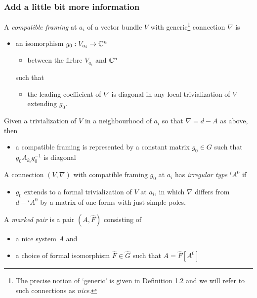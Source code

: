 \subsubsection{Add a little bit more information}
\begin{defn}
  A \emph{compatible framing} at $a_i$ of a vector bundle $V$ with
  generic\footnote{The precise notion of ‘generic’ is given in
    \cite{thboalch} Definition 1.2 and we will refer to such connections as
    \emph{nice}.} connection $\nabla$ is
  \begin{itemize}
    \item an isomorphism $g_0:V_{a_i}\to\mathbb{C}^n$
      \begin{itemize}
        \item between the firbre $V_{a_i}$ and $\mathbb{C}^n$
      \end{itemize}
      such that
      \begin{itemize}
        \item the leading coefficient of $\nabla$ is diagonal in any local
          trivialization of $V$ extending $g_0$.
      \end{itemize}
  \end{itemize}
  \begin{rem}
    Given a trivialization of $V$ in a neighbourhood of $a_i$ so that
    $\nabla=d-A$ as above, then
    \begin{itemize}
      \item a compatible framing is represented by a constant matrix
        $g_0\in G$ such that $g_0A_{k_i}g_0^{-1}$ is diagonal
    \end{itemize}
  \end{rem}
\end{defn}
\begin{paracol}{2}\sloppy
\switchcolumn[0]\noindent
  \begin{defn}[2.4]
    A connection $(V,\nabla)$ with compatible framing $g_0$ at $a_i$ has
    \emph{irregular type ${}^iA^0$} if
    \begin{itemize}
      \item $g_0$ extends to a formal trivialization of $V$ at $a_i$, in which
      $\nabla$ differs from $d-{}^iA^0$ by a matrix of one-forms with just
      simple poles.
    \end{itemize}
  \end{defn}
\switchcolumn[1]\noindent
  \begin{defn}
    A \emph{marked pair} is a pair $(A, \hat F)$ consisting of
    \begin{itemize}
      \item a nice system $A$ and
      \item a choice of formal isomorphism $\hat F \in \hat G$ such that
        $A = \hat F[A^0]$
    \end{itemize}
  \end{defn}
\end{paracol}
